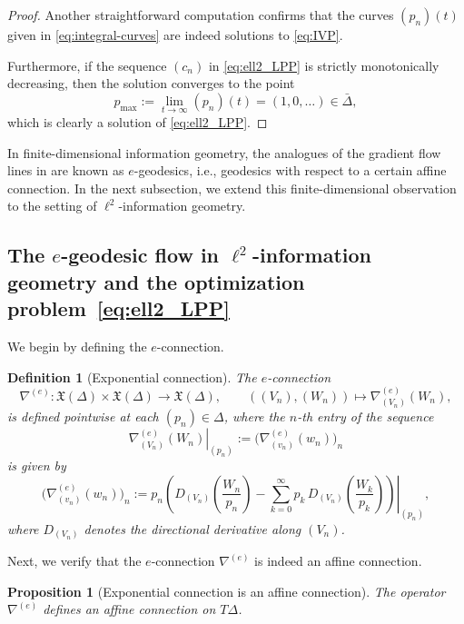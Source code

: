 \documentclass[12pt]{amsart}
\newtheorem{proposition}[proposition]{Proposition}
\newtheorem{definition}[definition]{Definition}
\numberwithin{figure}{section}
\numberwithin{table}{section}
\numberwithin{equation}{section}
\newcommand\restr[2]{\ensuremath{\left.#1\right|_{#2}}}
\begin{document}
\begin{proof}
Another straightforward computation confirms that the curves \( (p_n)(t) \) given in \eqref{eq:integral-curves} are indeed solutions to \eqref{eq:IVP}.

Furthermore, if the sequence \( (c_n) \) in \eqref{eq:ell2_LPP} is strictly monotonically decreasing, then the solution converges to the point
\[
p_{\max} := \lim_{t \to \infty} (p_n)(t) = (1, 0, \dots) \in \bar{\Delta},
\]
which is clearly a solution of \eqref{eq:ell2_LPP}.
\end{proof}

In finite-dimensional information geometry, the analogues of the gradient flow lines in  are known as \(e\)-geodesics, i.e., geodesics with respect to a certain affine connection. In the next subsection, we extend this finite-dimensional observation to the setting of \(\ell^2\)-information geometry.
\subsection{The \(e\)-geodesic flow in \(\ell^2\)-information geometry and the optimization problem~\eqref{eq:ell2_LPP}}\label{ss:The e-geodesic flow}
We begin by defining the \(e\)-connection.

\begin{definition}[Exponential connection]
The \emph{\(e\)-connection}
\[
\nabla^{(e)}:\mathfrak{X}(\Delta)\times\mathfrak{X}(\Delta)\longrightarrow \mathfrak{X}(\Delta), 
\qquad ((V_n),(W_n))\longmapsto \nabla^{(e)}_{(V_n)}(W_n),
\]
is defined pointwise at each \((p_n)\in \Delta\), where the \(n\)-th entry of the sequence
\[
\restr{\nabla^{(e)}_{(V_n)}(W_n)}{(p_n)}
:=
\bigl(\nabla^{(e)}_{(v_n)}(w_n)\bigr)_n
\]
is given by
\begin{equation}\label{eq:def_e_con_comp}
\bigl(\nabla^{(e)}_{(v_n)}(w_n)\bigr)_n
:=
p_n
\restr{\left(
D_{(V_n)}\!\left(\frac{W_n}{p_n}\right)
-
\sum_{k=0}^{\infty}
p_k\,D_{(V_n)}\!\left(\frac{W_k}{p_k}\right)
\right)}{(p_n)},
\end{equation}
where \(D_{(V_n)}\) denotes the directional derivative along \((V_n)\).
\end{definition}

Next, we verify that the \(e\)-connection \(\nabla^{(e)}\) is indeed an affine connection.

\begin{proposition}[Exponential connection is an affine connection]
The operator \(\nabla^{(e)}\) defines an affine connection on \(T\Delta\).
\end{proposition}
\end{document}
